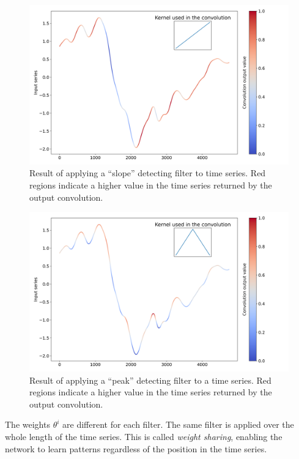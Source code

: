 \documentclass[a4paper,11pt,twoside]{report}
\theoremstyle{definition}
\begin{document}
\begin{figure}[h!t]
\centering
\includegraphics[width=17cm]{imgs/convolution_output_growth.png}
\caption{Result of applying a ``slope'' detecting filter to time series. Red regions indicate a higher value in the time series returned by the output convolution.}
\label{fig:convolution_output_growth}
\end{figure}
\FloatBarrier
\begin{figure}[h!]
\centering
\includegraphics[width=17cm]{imgs/convolution_output_hills.png}
\caption{Result of applying a ``peak'' detecting filter to a time series. Red regions indicate a higher value in the time series returned by the output convolution.}
\label{fig:convolution_output_hill}
\end{figure}

\FloatBarrier

The weights $\theta^i$ are different for each filter.
The same filter is applied over the whole length of the time series. This is called \textit{weight sharing}, enabling the network to learn patterns regardless of the position in the time series.
\end{document}
